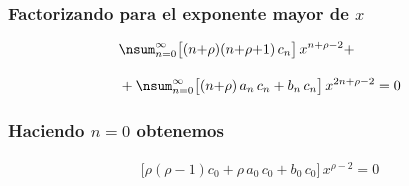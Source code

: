 \documentclass[12pt]{beamer}
\begin{document}
\begin{frame}
\frametitle{Factorizando para el exponente mayor de $x$}
\begin{align*}
&\nsum_{n=0}^{\infty} \big[ (n {+} \rho)(n {+} \rho {+} 1) \, c_{n} \big] \, x^{n+\rho-2} + \\[1em]
&+ \nsum_{n=0}^{\infty} \big[ (n {+} \rho) \, a_{n} \, c_{n} + b_{n} \, c_{n} \big] \, x^{2n+\rho-2} = 0
\end{align*}
\end{frame}
\begin{frame}
\frametitle{Haciendo $n = 0$ obtenemos}
\begin{align*}
\big[ \rho (\rho - 1) c_{0} + \rho \, a_{0} \, c_{0} + b_{0} \, c_{0} \big] \, x^{\rho-2} = 0
\end{align*}
\end{frame}





\end{document}
